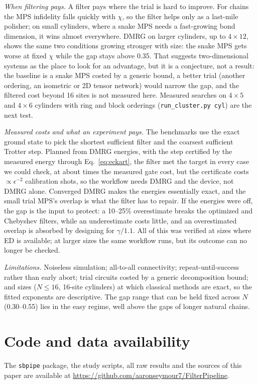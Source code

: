 \documentclass[aps,pra,twocolumn,superscriptaddress,nofootinbib]{revtex4-2}
\begin{document}
\emph{When filtering pays.} A filter pays where the trial is hard to improve. For chains the MPS infidelity falls
quickly with $\chi$, so the filter helps only as a last-mile polisher; on small cylinders, where a snake MPS needs a
fast-growing bond dimension, it wins almost everywhere. DMRG on larger cylinders, up to $4\times12$, shows the
same two conditions growing stronger with size: the snake MPS gets worse at fixed $\chi$ while the gap stays above 0.35.
That suggests two-dimensional systems as the place to look for an advantage, but it is a conjecture, not a result:
the baseline is a snake MPS costed by a generic bound, a better trial (another ordering, an isometric or 2D tensor
network) would narrow the gap, and the filtered cost beyond 16 sites is not measured here. Measured searches on
$4\times5$ and $4\times6$ cylinders with ring and block orderings (\texttt{run\_cluster.py cyl}) are the next test.

\emph{Measured costs and what an experiment pays.} The benchmarks use the exact ground state to pick the shortest
sufficient filter and the coarsest sufficient Trotter step. Planned from DMRG energies, with the step certified by the
measured energy through Eq.~\eqref{eq:eckart}, the filter met the target in every case we could check, at about
\ekRatioS{} times the measured gate cost, but the certificate costs $\propto\epsilon^{-2}$ calibration shots, so the
workflow needs DMRG and the device, not DMRG alone. Converged DMRG makes the energies essentially exact, and the
small trial MPS's overlap is what the filter has to repair. If the energies were off, the gap is the input to protect:
a 10--25\% overestimate breaks the optimized and Chebyshev filters, while an underestimate costs little, and an overestimated overlap is absorbed by designing for $\gamma/1.1$. All of this was verified at sizes where ED is available; at larger
sizes the same workflow runs, but its outcome can no longer be checked.

\emph{Limitations.} Noiseless simulation; all-to-all connectivity; repeat-until-success rather than early abort; trial
circuits costed by a generic decomposition bound; and sizes ($N\le16$, 16-site cylinders) at which classical methods
are exact, so the fitted exponents are descriptive. The gap range that can be held fixed across $N$ (0.30--0.55) lies
in the easy regime, well above the gaps of longer natural chains.

\section*{Code and data availability}
The \texttt{sbpipe} package, the study scripts, all raw results and the sources of this paper are available at
\url{https://github.com/aaronseymour7/FilterPipeline}.
\end{document}
